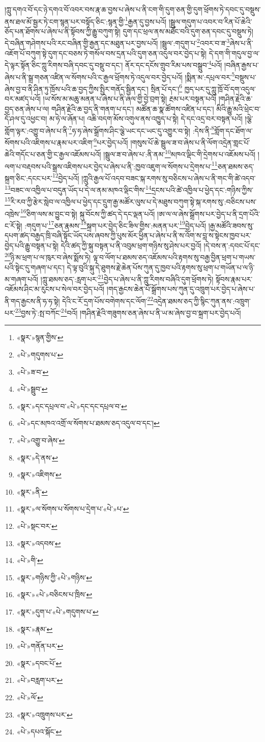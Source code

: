 །ཀླུ་དགའ་བོ་དང་ཉེ་དགའ་བོ་འབར་བས་རྣ་ཆ་བྱས་པ་ཞེས་པ་ནི་ངག་གི་དུག་ཅན་གྱི་དུག་ཕྲོགས་ཏེ་དབང་དུ་བསྡུས་ནས་ཐལ་མོ་སྦྱར་ཏེ་ངག་སྙན་པར་བསྟོད་ཅིང་:སྙན་གྱི་\footnote{«སྣར་»སྙན་གྱིས་}རྒྱན་དུ་བྱས་པའོ། །སྦྲུལ་གདུག་པ་འབར་བ་རིན་པོ་ཆེའི་ཅོད་པན་ཐོགས་པ་ཞེས་པ་ནི་སྟོབས་ཀྱི་རྒྱུ་བཀུག་སྟེ། དུག་དང་ཕྲལ་ནས་མཐོང་བའི་དུག་ཅན་དབང་དུ་བསྡུས་ཏེ། དེ་བཞིན་གཤེགས་པའི་རང་བཞིན་གྱི་རྒྱན་དང་མཐུན་པར་བྱས་པའོ། །སྦྲུལ་:གདུག་པ་\footnote{«པེ་»གདུགས་པ་}འབར་བ་ཟ་\footnote{«པེ་»ཟ་བ་}ཞེས་པ་ནི་འཇོག་པོ་བཀུག་སྟེ་དུག་དང་བཅས་ཏེ་གསོལ་བས་དྲན་པའི་དུག་ཅན་འདུལ་བར་བྱེད་པ་སྟེ། དེ་དག་གི་གདུལ་བྱ་ལ་དེ་ལྟར་སྟོན་ཅིང་ཀླུ་རིགས་བཞི་དབང་དུ་བསྡུ་བ་དང་། ནོར་དང་དངོས་གྲུབ་རིམ་པས་བསྒྲུབ་\footnote{«པེ་»སྦྲུབ་}པའོ། །བཞིན་རྒྱས་པ་ཞེས་པ་ནི་སྒྲ་གཅན་འཛིན་ལ་སོགས་པའི་ང་རྒྱལ་ཕྲོགས་ཏེ་འདུལ་བར་བྱེད་པའོ། །སྨིན་མ་:དཔྲལ་བར་\footnote{«སྣར་»དང་དཔྲལ་བ་«པེ་»དང་དང་དཔྲལ་བ་}བསྡུས་པ་ཞེས་བྱ་བ་ནི་ཤིན་ཏུ་ཁྲོས་པའི་ཆ་བྱད་ཀྱིས་སྤྱིར་གནོད་སྦྱིན་དང་། སྲིན་པོ་དང་།\footnote{«པེ་»དང་མཁའ་འགྲོ་ལ་སོགས་པ་ཐམས་ཅད་འདུལ་བ་དང་།} ཁྱད་པར་དུ་ཀླུ་ཁྲོ་བོ་དག་འདུལ་བར་མཛད་པའོ། །ཡ་སོས་མ་མཆུ་མནན་པ་ཞེས་པ་ནི་ཞལ་གྱི་བྱེ་བྲག་སྟེ། རྔམ་པར་བསྟན་པའོ། །གཤིན་རྗེའི་ཆ་བྱད་ཅན་ཞེས་པ་ལ། གཤིན་རྗེའི་ཆ་བྱད་ནི་གནག་པ་དང་། མཚོན་ཆ་སྣ་ཚོགས་འཛིན་པ་དང་། མིའི་རྒྱུ་མའི་ཕྲེང་བ་དོ་ཤལ་དུ་འཕྱང་བ། མ་ཧེ་ལ་ཞོན་པ། འཆི་བདག་མོས་འགུལ་ནས་འཁྱུད་པ་སྟེ། དེ་དང་འདྲ་བར་བསྟན་པའོ། །ལྕེ་གློག་ལྟར་:འགྱུ་བ་ཞེས་པ་ནི་\footnote{«པེ་»འགྱུ་བ་ཞེས་}ཧ་ཧ་ཞེས་སྒྲོགས་ཤིང་ལྕེ་ཡང་དང་ཡང་དུ་འགྱུར་བ་སྟེ། :དེས་ནི་\footnote{«སྣར་»དེ་ནས་}གློག་དང་ཐོག་ལ་སོགས་པའི་འཇིགས་པ་རྣམ་པར་འཇིག་\footnote{«སྣར་»འཇིགས་}པར་བྱེད་པའོ། །གསུས་པོ་ཆེ་སྦྲུལ་ཟ་བ་ཞེས་པ་ནི་ལོག་འདྲེན་གླང་པོ་ཆེའི་གདོང་པ་ཅན་གྱི་ང་རྒྱལ་འཇོམས་པའོ། །སྦྲུལ་ཟ་བ་ཞེས་པ་:ནི་ནམ་\footnote{«སྣར་»ནི་}མཁའ་ལྡིང་གི་དྲེགས་པ་འཇོམས་པའོ། །ལག་པ་བརྡབས་པའི་སྒྲས་འཇིགས་པར་བྱེད་པ་ཞེས་པ་ནི་:ཁྱབ་འཇུག་ལ་སོགས་པ་དྲེགས་པ་\footnote{«སྣར་»ལ་སོགས་པ་སོགས་པ་དྲེག་པ་«པེ་»པ་}ཅན་ཐམས་ཅད་སྐྲག་ཅིང་:དངང་པར་\footnote{«པེ་»སྡང་བར་}བྱེད་པའོ། །ཀླུའི་རྒྱལ་པོ་འདབ་བཟང་སྐ་རགས་སུ་བཅིངས་པ་ཞེས་པ་ནི་གང་གི་ཚེ་འདབ་\footnote{«སྣར་»འདབས་}བཟང་ལ་འཁྱིལ་པ་བདུན་ཡོད་པ་དེ་ལ་ནམ་མཁའ་ལྡིང་གིས་\footnote{«པེ་»གི་}དྲངས་པའི་ཚེ་འཁྱིལ་པ་ཕྱེད་དང་:གཉིས་ཀྱིས་\footnote{«སྣར་»གཉིས་ཀྱི་«པེ་»གཉིས་}རི་རབ་ཀྱི་རྩེར་སླེབ་ལ་འཁྱིལ་པ་ཕྱེད་དང་དྲུག་རྒྱ་མཚོར་ལུས་པ་དེ་མཐུས་བཀུག་སྟེ་སྐ་རགས་སུ་:བཅིངས་པས་འཁྲེས་\footnote{«སྣར་»«པེ་»བཅིངས་པ་ཁྲིས་}ཅིག་ལས་མ་བྱུང་བ་སྟེ། སྐུ་བོངས་ཀྱི་ཚད་དེ་དང་ལྡན་པའོ། །ཨ་ལ་ལ་ཞེས་སྒྲོགས་པར་བྱེད་པ་ནི་དྲག་པོའི་ང་རོ་སྟེ། :གདུག་པ་\footnote{«སྣར་»དུག་པ་«པེ་»གདུགས་པ་}ཅན་རྣམས་\footnote{«སྣར་»རྣམ་}སྐྲག་པར་བྱེད་ཅིང་ཟིལ་གྱིས་:མནན་པར་\footnote{«པེ་»གནོན་པར་}བྱེད་པའོ། །རྒྱ་མཚོའི་ཟབས་སུ་དཔག་ཚད་བརྒྱད་ཁྲི་བཞི་སྟོང་ཡོད་པས་ཞབས་ཀྱི་པུས་མོར་ཕྱིན་པ་ཞེས་པ་ནི་ས་འོག་ས་བླ་ས་སྟེངས་ཁྱབ་པར་བྱེད་པའི་རྒྱུ་བསྟན་པ་སྟེ། དེའི་ཚད་ཀྱི་སྐུ་བསྟན་པ་ནི་འབུམ་ཕྲག་གཉིས་སུ་ཤེས་པར་བྱའོ། །དེ་བས་ན་:དབང་པོ་དང་\footnote{«སྣར་»དབང་པོ་}ཉི་མ་ཕྲག་པ་ལ་ཁུར་བ་ཞེས་སྨོས་ཏེ། ལྟ་བ་ལོག་པ་ཐམས་ཅད་འཇོམས་པའི་རྟགས་སུ་བརྒྱ་བྱིན་ཕྲག་པ་གཡས་པའི་སྟེང་དུ་གཞག་པ་དང་། དེ་ལྟ་བུའི་སྐུ་དེ་ཐུགས་རྗེ་ཆེན་པོས་ཀུན་དུ་ཁྱབ་པའི་རྟགས་སུ་ཕྲག་པ་གཡོན་པ་ལ་ཉི་མ་གཞག་པའོ། །ཀླུ་ཐམས་ཅད་:རླག་པར་\footnote{«པེ་»བརླག་པར་}བྱེད་པ་ཞེས་པ་ནི་ཀླུ་རིགས་བཞིའི་དུག་ཕྲོགས་ཏེ། སྟོབས་རྣམ་པར་འཇོམས་ཤིང་མ་རུངས་པ་སེལ་བར་བྱེད་པའོ། །གད་རྒྱངས་ཆེན་པོ་སྒྲོགས་པས་ཀུན་དུ་འཁྲུག་པར་བྱེད་པ་ཞེས་པ་ནི་གད་རྒྱངས་ནི་ཧ་ཧ་སྟེ། དེའི་ང་རོ་དྲག་པོས་བགེགས་དང་ལོག་\footnote{«པེ་»ལོ་}འདྲེན་ཐམས་ཅད་ཀྱི་སྙིང་ཀུན་ནས་:འཁྲུག་པར་\footnote{«སྣར་»འཁྲུགས་པར་}བྱས་ཏེ་:སྤ་བཀོང་\footnote{«པེ་»དཔའ་སྐོང་}བའོ། །གཤིན་རྗེའི་གཟུགས་ཅན་ཞེས་པ་ནི་ཡ་མ་ཞེས་བྱ་བ་སྐྲག་པར་བྱེད་པའོ། 